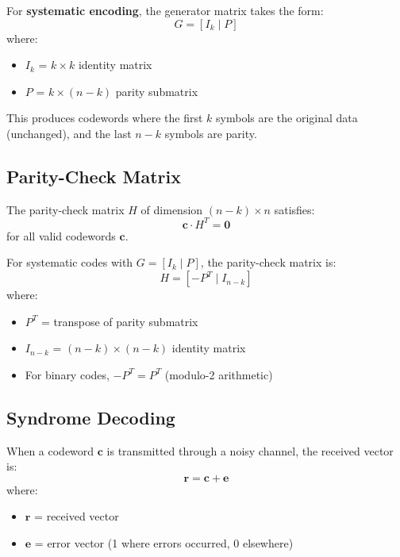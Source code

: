 For \textbf{systematic encoding}, the generator matrix takes the form:
\begin{equation}
G = [I_k \mid P]
\end{equation}
where:
\begin{itemize}
\item $I_k$ = $k \times k$ identity matrix
\item $P$ = $k \times (n-k)$ parity submatrix
\end{itemize}

This produces codewords where the first $k$ symbols are the original data (unchanged), and the last $n-k$ symbols are parity.

\subsection{Parity-Check Matrix}

The parity-check matrix $H$ of dimension $(n-k) \times n$ satisfies:
\begin{equation}
\mathbf{c} \cdot H^T = \mathbf{0}
\end{equation}
for all valid codewords $\mathbf{c}$.

For systematic codes with $G = [I_k \mid P]$, the parity-check matrix is:
\begin{equation}
H = [-P^T \mid I_{n-k}]
\end{equation}
where:
\begin{itemize}
\item $P^T$ = transpose of parity submatrix
\item $I_{n-k}$ = $(n-k) \times (n-k)$ identity matrix
\item For binary codes, $-P^T = P^T$ (modulo-2 arithmetic)
\end{itemize}

\subsection{Syndrome Decoding}

When a codeword $\mathbf{c}$ is transmitted through a noisy channel, the received vector is:
\begin{equation}
\mathbf{r} = \mathbf{c} + \mathbf{e}
\end{equation}
where:
\begin{itemize}
\item $\mathbf{r}$ = received vector
\item $\mathbf{e}$ = error vector (1 where errors occurred, 0 elsewhere)
\end{itemize}

